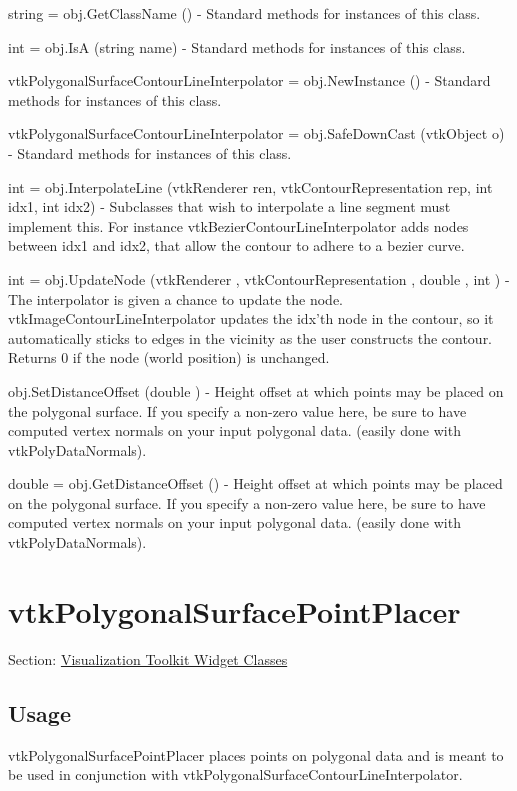 \begin{DoxyItemize}
\item {\ttfamily string = obj.\-Get\-Class\-Name ()} -\/ Standard methods for instances of this class.  
\item {\ttfamily int = obj.\-Is\-A (string name)} -\/ Standard methods for instances of this class.  
\item {\ttfamily vtk\-Polygonal\-Surface\-Contour\-Line\-Interpolator = obj.\-New\-Instance ()} -\/ Standard methods for instances of this class.  
\item {\ttfamily vtk\-Polygonal\-Surface\-Contour\-Line\-Interpolator = obj.\-Safe\-Down\-Cast (vtk\-Object o)} -\/ Standard methods for instances of this class.  
\item {\ttfamily int = obj.\-Interpolate\-Line (vtk\-Renderer ren, vtk\-Contour\-Representation rep, int idx1, int idx2)} -\/ Subclasses that wish to interpolate a line segment must implement this. For instance vtk\-Bezier\-Contour\-Line\-Interpolator adds nodes between idx1 and idx2, that allow the contour to adhere to a bezier curve.  
\item {\ttfamily int = obj.\-Update\-Node (vtk\-Renderer , vtk\-Contour\-Representation , double , int )} -\/ The interpolator is given a chance to update the node. vtk\-Image\-Contour\-Line\-Interpolator updates the idx'th node in the contour, so it automatically sticks to edges in the vicinity as the user constructs the contour. Returns 0 if the node (world position) is unchanged.  
\item {\ttfamily obj.\-Set\-Distance\-Offset (double )} -\/ Height offset at which points may be placed on the polygonal surface. If you specify a non-\/zero value here, be sure to have computed vertex normals on your input polygonal data. (easily done with vtk\-Poly\-Data\-Normals).  
\item {\ttfamily double = obj.\-Get\-Distance\-Offset ()} -\/ Height offset at which points may be placed on the polygonal surface. If you specify a non-\/zero value here, be sure to have computed vertex normals on your input polygonal data. (easily done with vtk\-Poly\-Data\-Normals).  
\end{DoxyItemize}\hypertarget{vtkwidgets_vtkpolygonalsurfacepointplacer}{}\section{vtk\-Polygonal\-Surface\-Point\-Placer}\label{vtkwidgets_vtkpolygonalsurfacepointplacer}
Section\-: \hyperlink{sec_vtkwidgets}{Visualization Toolkit Widget Classes} \hypertarget{vtkwidgets_vtkxyplotwidget_Usage}{}\subsection{Usage}\label{vtkwidgets_vtkxyplotwidget_Usage}
vtk\-Polygonal\-Surface\-Point\-Placer places points on polygonal data and is meant to be used in conjunction with vtk\-Polygonal\-Surface\-Contour\-Line\-Interpolator.

